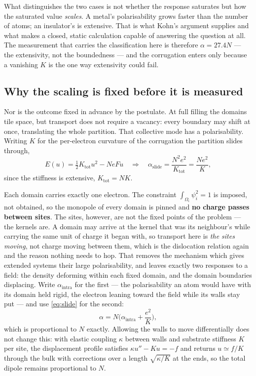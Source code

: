 \documentclass[11pt]{article}
\begin{document}
What distinguishes the two cases is not whether the response saturates but how the saturated value
\emph{scales}. A metal's polarisability grows faster than the number of atoms; an insulator's is
extensive. That is what Kohn's argument supplies and what makes a closed, static calculation
capable of answering the question at all. The measurement that carries the classification here is
therefore $\alpha = 27.4N$ --- the extensivity, not the boundedness --- and the corrugation enters
only because a vanishing $K$ is the one way extensivity could fail.

\subsection{Why the scaling is fixed before it is measured}

Nor is the outcome fixed in advance by the postulate. At full filling the domains tile space, but
transport does not require a vacancy: every boundary may shift at once, translating the whole
partition. That collective mode has a polarisability. Writing $K$ for the per-electron curvature
of the corrugation the partition slides through,
\begin{equation}
E(u) = \tfrac12 K_{\text{tot}}u^2 - NeFu
\quad\Longrightarrow\quad
\alpha_{\text{slide}} = \frac{N^2e^2}{K_{\text{tot}}} = \frac{Ne^2}{K},
\label{eq:slide}
\end{equation}
since the stiffness is extensive, $K_{\text{tot}}=NK$.

Each domain carries exactly one electron. The constraint $\int_{\Omega_i}\psi_i^2 = 1$ is imposed,
not obtained, so the monopole of every domain is pinned and \textbf{no charge passes between
sites}. The sites, however, are not the fixed points of the problem --- the kernels are. A domain
may arrive at the kernel that was its neighbour's while carrying the same unit of charge it began
with, so transport here is \emph{the sites moving}, not charge moving between them, which is the
dislocation relation again and the reason nothing needs to hop. That removes the mechanism which gives extended systems their large polarisability, and
leaves exactly two responses to a field: the density deforming within each fixed domain, and the
domain boundaries displacing. Write $\alpha_{\text{intra}}$ for the first --- the polarisability an
atom would have with its domain held rigid, the electron leaning toward the field while its walls
stay put --- and use \eqref{eq:slide} for the second:
\begin{equation}
\alpha = N\Big(\alpha_{\text{intra}} + \frac{e^2}{K}\Big),
\label{eq:extensive}
\end{equation}
which is proportional to $N$ exactly. Allowing the walls to move differentially does not change
this: with elastic coupling $\kappa$ between walls and substrate stiffness $K$ per site, the
displacement profile satisfies $\kappa u'' - K u = -f$ and returns $u \simeq f/K$ through the bulk
with corrections over a length $\sqrt{\kappa/K}$ at the ends, so the total dipole remains
proportional to $N$.
\end{document}
